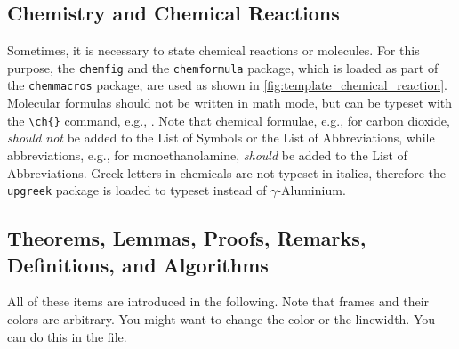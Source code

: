 \subsection{Chemistry and Chemical Reactions}
Sometimes, it is necessary to state chemical reactions or molecules. For this purpose, the \verb+chemfig+ and the \verb+chemformula+ package, which is loaded as part of the \verb+chemmacros+ package, are used as shown in \autoref{fig:template_chemical_reaction}. Molecular formulas should not be written in math mode, but can be typeset with the \verb+\ch{}+ command, e.g., . Note that chemical formulae, e.g.,  for carbon dioxide, \emph{should not} be added to the List of Symbols or the List of Abbreviations, while abbreviations, e.g.,  for monoethanolamine, \emph{should} be added to the List of Abbreviations. Greek letters in chemicals are not typeset in italics, therefore the \verb+upgreek+ package is loaded to typeset  instead of $\gamma$-Aluminium.
\subsection{Theorems, Lemmas, Proofs, Remarks, Definitions, and Algorithms}
All of these items are introduced in the following. Note that frames and their colors are arbitrary. You might want to change the color or the linewidth. You can do this in the  file.

